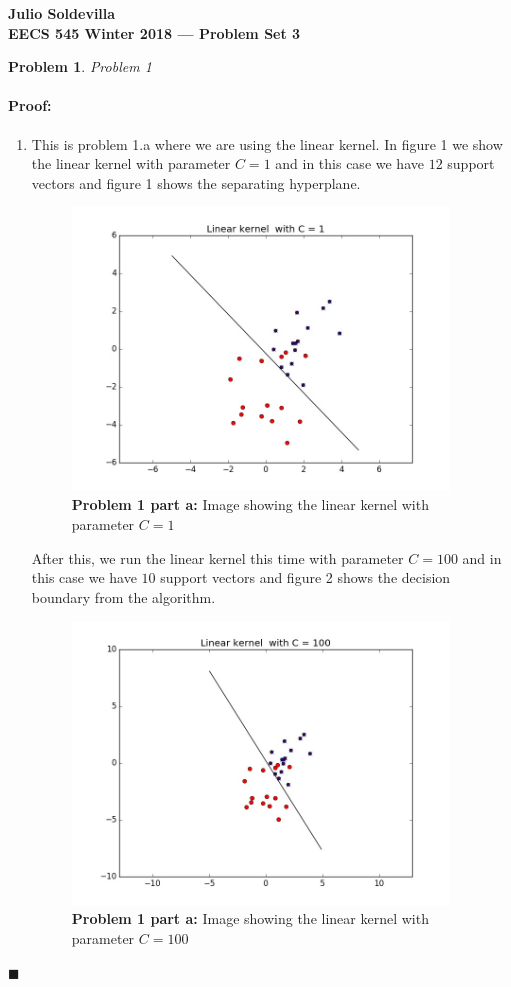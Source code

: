 \documentclass[12pt]{article}
\newenvironment{proof}{\paragraph{Proof: }}{\hfill$\blacksquare$}
\newtheorem{problem}{Problem}%
\begin{document}
\begin{center}
{\bf Julio Soldevilla}
\\
{\bf EECS 545 Winter 2018 --- Problem Set 3 }
\end{center}

\begin{problem}
\normalfont
Problem 1
\end{problem}

\begin{proof}

\begin{enumerate}

\item This is problem 1.a where we are using the linear kernel. In figure 1 we show the linear kernel with parameter $C = 1$ and in this case we have $12$ support vectors and figure 1 shows the separating hyperplane. 
\begin{figure}[!htbp]
\centering
\includegraphics[width=10cm]{prob1_1_linear_C1.jpg}
\caption{\textbf{Problem 1 part a:} Image showing the linear kernel with parameter $C = 1$}
\end{figure} 

After this, we run the linear kernel this time with parameter $C = 100$ and in this case we have $10$ support vectors and figure 2 shows the decision boundary from the algorithm. 

\begin{figure}[!htbp]
\centering
\includegraphics[width=10cm]{prob1_1_linear_C100.jpg}
\caption{\textbf{Problem 1 part a:} Image showing the linear kernel with parameter $C = 100$}
\end{figure} 


\end{enumerate}
\end{proof}
\end{document}
